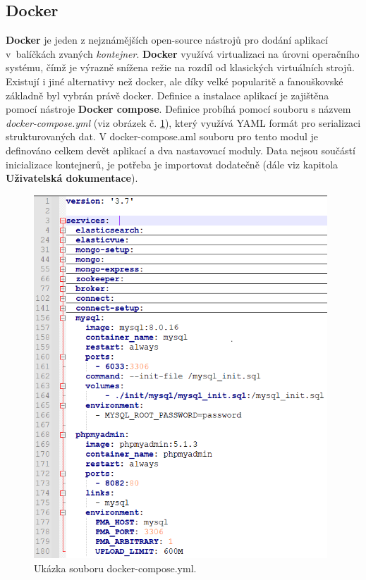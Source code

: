 \subsection{Docker}
\textbf{Docker} je jeden z nejznámějších open-source nástrojů pro dodání aplikací v~balíčkách zvaných \textit{kontejner}. \textbf{Docker} využívá virtualizaci na úrovni operačního systému, čímž je výrazně snížena režie na rozdíl od klasických virtuálních strojů. Existují i jiné alternativy než docker, ale díky velké popularitě a fanouškovské základně byl vybrán právě docker.
\newline
\indent Definice a instalace aplikací je zajištěna pomocí nástroje \textbf{Docker compose}. Definice probíhá pomocí souboru s názvem \textit{docker-compose.yml} (viz obrázek č. \ref{fig:compose}), který využívá \gls{YAML} formát pro serializaci strukturovaných dat. V docker-compose.aml souboru pro tento modul je definováno celkem devět aplikací a dva nastavovací moduly. Data nejsou součástí inicializace kontejnerů, je potřeba je importovat dodatečně (dále viz kapitola \textbf{Uživatelská dokumentace}).
\begin{figure}[H]
\centering
\includegraphics[width=11cm]{img/compose}
\caption{Ukázka souboru docker-compose.yml.}
\label{fig:compose}
\end{figure}

